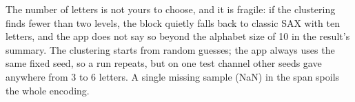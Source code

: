The number of letters is not yours to choose, and it is fragile: if the clustering finds
fewer than two levels, the block quietly falls back to classic SAX with ten letters, and the
app does not say so beyond the alphabet size of 10 in the result's summary. The clustering
starts from random guesses; the app always uses the same fixed seed, so a run repeats, but
on one test channel other seeds gave anywhere from 3 to 6 letters. A single
missing sample (NaN) in the span spoils the whole encoding.
